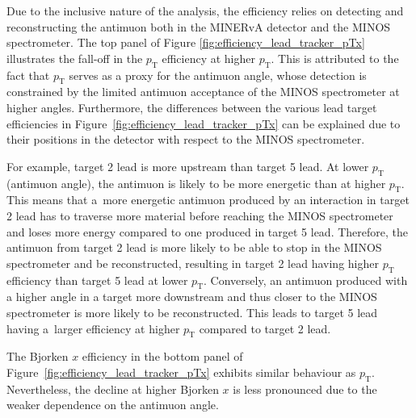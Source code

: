 
Due to the inclusive nature of the analysis, the efficiency relies on detecting and reconstructing the antimuon both in the MINERvA detector and the MINOS spectrometer. The top panel of Figure \ref{fig:efficiency_lead_tracker_pTx} illustrates the fall-off in the $p_{\text{T}}$ efficiency at higher $p_{\text{T}}$.\enlargethispage{1\baselineskip} This is attributed to the fact that $p_{\text{T}}$ serves as a proxy for the antimuon angle, whose detection is constrained by the limited antimuon acceptance of the MINOS spectrometer at higher angles. Furthermore, the differences between the various lead target efficiencies in Figure~\ref{fig:efficiency_lead_tracker_pTx} can be explained due to their positions in the detector with respect to the MINOS spectrometer.

For example, target 2 lead is more upstream than target 5 lead. At lower $p_{\text{T}}$ (antimuon angle), the antimuon is likely to be more energetic than at higher $p_{\text{T}}$. This means that a~more energetic antimuon produced by an interaction in target 2 lead has to traverse more material before reaching the MINOS spectrometer and loses more energy compared to one produced in target 5 lead. Therefore, the antimuon from target 2 lead is more likely to be able to stop in the MINOS spectrometer and be reconstructed, resulting in target 2 lead having higher $p_{\text{T}}$ efficiency than target 5 lead at lower $p_{\text{T}}$. Conversely, an antimuon produced with a higher angle in a target more downstream and thus closer to the MINOS spectrometer is more likely to be reconstructed. This leads to target 5 lead having a~larger efficiency at higher $p_{\text{T}}$ compared to target 2 lead.

The Bjorken $x$ efficiency in the bottom panel of Figure~\ref{fig:efficiency_lead_tracker_pTx} exhibits similar behaviour as $p_{\text{T}}$. Nevertheless, the decline at higher Bjorken $x$ is less pronounced due to the weaker dependence on the antimuon angle. 

